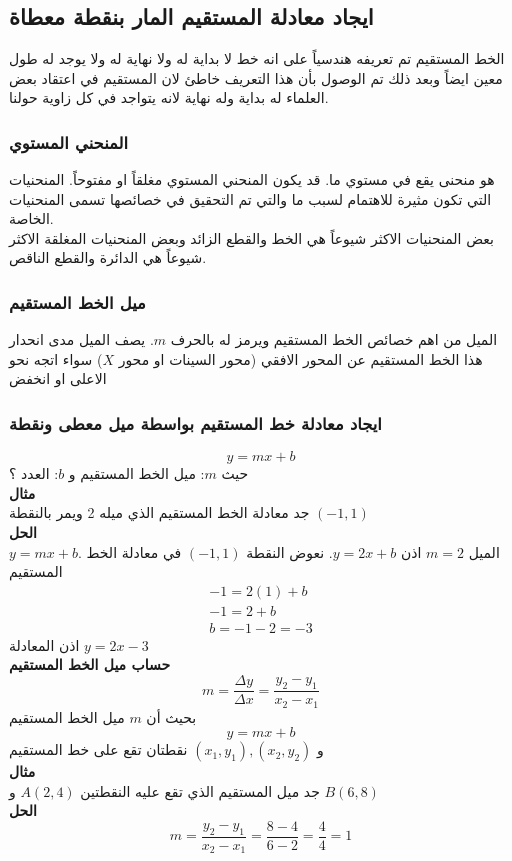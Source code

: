 \chapter{}
\section*{ايجاد معادلة المستقيم المار بنقطة معطاة}
الخط المستقيم تم تعريفه هندسياً على انه خط لا بداية له ولا نهاية له ولا يوجد له طول معين ايضاً وبعد ذلك تم الوصول بأن هذا التعريف خاطئ لان المستقيم في اعتقاد بعض العلماء له بداية وله نهاية لانه يتواجد في كل زاوية حولنا.

\subsection*{المنحني المستوي}
هو منحنى يقع في مستوي ما. قد يكون المنحني المستوي مغلقاً او مفتوحاً. المنحنيات التي تكون مثيرة للاهتمام لسبب ما والتي تم التحقيق في خصائصها تسمى المنحنيات الخاصة.\\
بعض المنحنيات الاكثر شيوعاً هي الخط والقطع الزائد وبعض المنحنيات المغلقة الاكثر شيوعاً هي الدائرة والقطع الناقص.

\subsection*{ميل الخط المستقيم} 
الميل من اهم خصائص الخط المستقيم ويرمز له بالحرف $m$. يصف الميل مدى انحدار
هذا الخط المستقيم عن المحور الافقي (محور السينات او محور $X$) سواء اتجه نحو الاعلى  او انخفض

\subsection*{ايجاد معادلة خط المستقيم بواسطة ميل معطى ونقطة}
\[
y = mx + b
\]
حيث $m$: ميل الخط المستقيم و $b$: العدد ؟\\ [10pt]
\noindent
\textbf{مثال}\\
\noindent
جد معادلة الخط المستقيم الذي ميله 2 ويمر بالنقطة 
$(-1,1)$\\
\noindent
\textbf{الحل}\\
\noindent
$y = mx + b$. الميل $m=2$ اذن $y = 2x + b$. نعوض النقطة $(-1,1)$ في معادلة الخط المستقيم
\begin{gather*}
	-1 = 2(1) + b\\
	-1 = 2+b\\
	b = -1-2 = -3
\end{gather*}
اذن المعادلة $y=2x-3$\\ [10pt]
\textbf{حساب ميل الخط المستقيم}
\[
m = \frac{\Delta y}{\Delta x} = \frac{y_2 - y_1}{x_2 - x_1}
\]
بحيث أن $m$ ميل الخط المستقيم 
\[
y = mx + b
\]
و $(x_1, y_1), (x_2, y_2)$ نقطتان تقع على خط المستقيم\\
\noindent
\textbf{مثال}\\
\noindent
جد ميل المستقيم الذي تقع عليه النقطتين $A(2,4)$ و $B(6,8)$\\
\noindent
\textbf{الحل}
\[
m = \frac{y_2 - y_1}{x_2 - x_1} = \frac{8-4 }{6-2} = \frac{4}{4} = 1
\]

